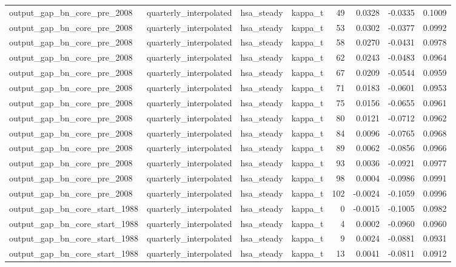 \begin{tabular}{llllrrrr}
output\_gap\_bn\_core\_pre\_2008 & quarterly\_interpolated & hsa\_steady & kappa\_t & 49 & 0.0328 & -0.0335 & 0.1009 \\
output\_gap\_bn\_core\_pre\_2008 & quarterly\_interpolated & hsa\_steady & kappa\_t & 53 & 0.0302 & -0.0377 & 0.0992 \\
output\_gap\_bn\_core\_pre\_2008 & quarterly\_interpolated & hsa\_steady & kappa\_t & 58 & 0.0270 & -0.0431 & 0.0978 \\
output\_gap\_bn\_core\_pre\_2008 & quarterly\_interpolated & hsa\_steady & kappa\_t & 62 & 0.0243 & -0.0483 & 0.0964 \\
output\_gap\_bn\_core\_pre\_2008 & quarterly\_interpolated & hsa\_steady & kappa\_t & 67 & 0.0209 & -0.0544 & 0.0959 \\
output\_gap\_bn\_core\_pre\_2008 & quarterly\_interpolated & hsa\_steady & kappa\_t & 71 & 0.0183 & -0.0601 & 0.0953 \\
output\_gap\_bn\_core\_pre\_2008 & quarterly\_interpolated & hsa\_steady & kappa\_t & 75 & 0.0156 & -0.0655 & 0.0961 \\
output\_gap\_bn\_core\_pre\_2008 & quarterly\_interpolated & hsa\_steady & kappa\_t & 80 & 0.0121 & -0.0712 & 0.0962 \\
output\_gap\_bn\_core\_pre\_2008 & quarterly\_interpolated & hsa\_steady & kappa\_t & 84 & 0.0096 & -0.0765 & 0.0968 \\
output\_gap\_bn\_core\_pre\_2008 & quarterly\_interpolated & hsa\_steady & kappa\_t & 89 & 0.0062 & -0.0856 & 0.0966 \\
output\_gap\_bn\_core\_pre\_2008 & quarterly\_interpolated & hsa\_steady & kappa\_t & 93 & 0.0036 & -0.0921 & 0.0977 \\
output\_gap\_bn\_core\_pre\_2008 & quarterly\_interpolated & hsa\_steady & kappa\_t & 98 & 0.0004 & -0.0986 & 0.0991 \\
output\_gap\_bn\_core\_pre\_2008 & quarterly\_interpolated & hsa\_steady & kappa\_t & 102 & -0.0024 & -0.1059 & 0.0996 \\
output\_gap\_bn\_core\_start\_1988 & quarterly\_interpolated & hsa\_steady & kappa\_t & 0 & -0.0015 & -0.1005 & 0.0982 \\
output\_gap\_bn\_core\_start\_1988 & quarterly\_interpolated & hsa\_steady & kappa\_t & 4 & 0.0002 & -0.0960 & 0.0960 \\
output\_gap\_bn\_core\_start\_1988 & quarterly\_interpolated & hsa\_steady & kappa\_t & 9 & 0.0024 & -0.0881 & 0.0931 \\
output\_gap\_bn\_core\_start\_1988 & quarterly\_interpolated & hsa\_steady & kappa\_t & 13 & 0.0041 & -0.0811 & 0.0912 \\

\end{tabular}
